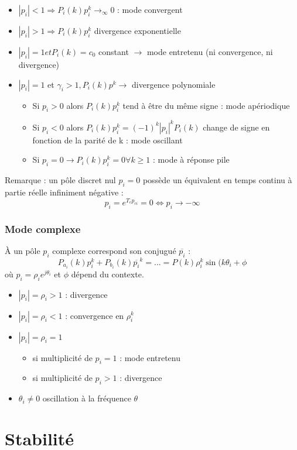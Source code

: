 \documentclass[main.tex]{subfiles}
\begin{document}
\begin{itemize}
\item $|p_i|<1 \Rightarrow P_i(k)p_i^k \rightarrow_{\infty} 0$ : mode convergent
\item $|p_i|>1 \Rightarrow P_i(k)p_i^k $ divergence exponentielle
\item $ |p_i| = 1 et P_i(k) = c_0$ constant $\rightarrow$ mode entretenu (ni convergence, ni divergence)
\item $ |p_i| = 1 $ et $ \gamma_i > 1, P_i(k)p ^k \rightarrow $ divergence polynomiale
\begin{itemize}
\item Si $p_i > 0$ alors $ P_i(k)p_i^k$ tend à être du même signe : mode apériodique
\item Si $p_i < 0$ alors $P_i(k)p_i^k = (-1)^k |p_i|^k P_i(k)$ change de signe en fonction de la parité de k : mode oscillant
\item Si $p_i = 0 \rightarrow P_i(k)p_i^k = 0 \forall
k\geq 1$ : mode à réponse pile
\end{itemize}
\end{itemize}
Remarque : un pôle discret nul $p_i = 0$ possède un équivalent en temps continu à partie réelle infiniment négative :
\[p_i = e^{T_ep_{ci}} = 0 \Leftrightarrow p_{i} \rightarrow - \infty\]

\subsubsection{Mode complexe}
À un pôle $p_i$ complexe correspond son conjugué $\overline{p_i}$ :
\[P_{a_i}(k)p_i^k + P_{b_i}(k)\overline{p_i}^k = ... = P(k)\rho_i^k\sin(k\theta_i+\phi\]
où $p_i = \rho_ie^{j\theta_i}$ et $\phi$ dépend du contexte.
\begin{itemize}
\item $|p_i| = \rho_i > 1$ : divergence
\item $|p_i| = \rho_i < 1$ : convergence en $\rho_i^k$
\item $|p_i| = \rho_i = 1$
\begin{itemize}
\item si multiplicité de $p_i = 1$ : mode entretenu
\item si multiplicité de $p_i > 1$ : divergence
\end{itemize}
\item $\theta_i \neq 0$ oscillation à la fréquence $\theta$
\end{itemize}

\section{Stabilité}
\end{document}
